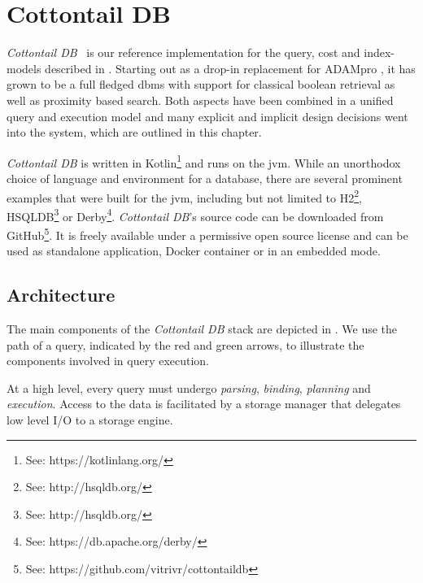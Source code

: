 \chapter{Cottontail DB}
\label{chapter:cottontaildb}

\emph{Cottontail DB}~\cite{Gasser:2020cottontail} is our reference implementation for the query, cost and index-models described in . Starting out as a drop-in replacement for ADAMpro \cite{Giangreco:2016adam}, it has grown to be a full fledged \acrshort{dbms} with support for classical boolean retrieval as well as proximity based search. Both aspects have been combined in a unified query and execution model and many explicit and implicit design decisions went into the system, which are outlined in this chapter.

\emph{Cottontail DB} is written in Kotlin\footnote{See: https://kotlinlang.org/} and runs on the \acrfull{jvm}. While an unorthodox choice of language and environment for a database, there are several prominent examples that were built for the \acrshort{jvm}, including but not limited to H2\footnote{See: http://hsqldb.org/}, HSQLDB\footnote{See: http://hsqldb.org/} or Derby\footnote{See: https://db.apache.org/derby/}. \emph{Cottontail DB}'s source code can be downloaded from GitHub\footnote{See: https://github.com/vitrivr/cottontaildb}. It is freely available under a permissive open source license and can be used as standalone application, Docker container or in an embedded mode.

\section{Architecture}

The main components of the \emph{Cottontail DB} stack are depicted in . We use the path of a query, indicated by the red and green arrows, to illustrate the components involved in query execution.

At a high level, every query must undergo \emph{parsing}, \emph{binding}, \emph{planning} and \emph{execution}. Access to the data is facilitated by a storage manager that delegates low level I/O to a storage engine. 

